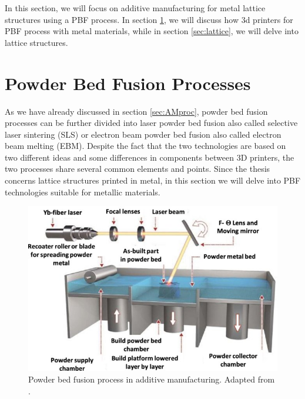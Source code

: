 \setlength{\tabcolsep}{10pt}
In this section, we will focus on additive manufacturing for metal lattice structures using a PBF process. In section \ref{sec:pbf_proc}, we will discuss how 3d printers for PBF process with metal materials, while in section \ref{sec:lattice}, we will delve into lattice structures.
\section{Powder Bed Fusion Processes}\label{sec:pbf_proc}
As we have already discussed in section \ref{sec:AMproc}, powder bed fusion processes can be further divided into laser powder bed fusion also called selective laser sintering (SLS) or electron beam powder bed fusion also called electron beam melting (EBM). Despite the fact that the two technologies are based on two different ideas and some differences in components between 3D printers, the two processes share several common elements and points. Since the thesis concerns lattice structures printed in metal, in this section we will delve into PBF technologies suitable for metallic materials. 
\begin{figure}[H]
    \centering
    \includegraphics[scale=1.3]{Images/PBF.jpg}
    \caption[PBF in AM.]{Powder bed fusion process in additive manufacturing. Adapted from \cite{ozel_focus_2020}.}
    \label{fig:PBF}
\end{figure}

